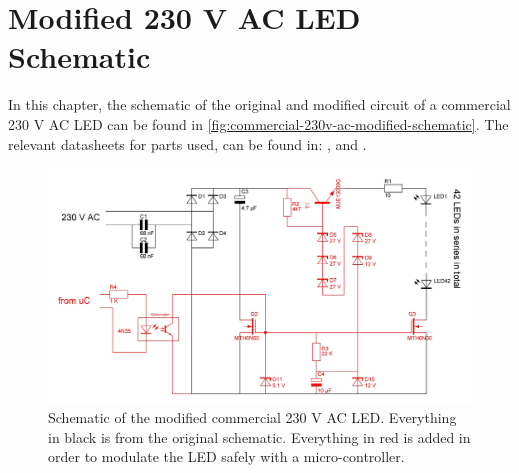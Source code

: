 
\chapter{Modified 230 V AC LED Schematic}
\label{app:commercial-230v-ac-modified-schematic}

In this chapter, the schematic of the original and modified circuit of a commercial 230 V AC LED can be found in \autoref{fig:commercial-230v-ac-modified-schematic}.
The relevant datasheets for parts used, can be found in: \cite{4n35-optocoupler-datasheet}, \cite{mth6n60-n-power-fet-datasheet} and \cite{mje13009g-npn-power-transistor-datasheet}.




\begin{figure}[htb]
	\includegraphics[angle=90,width=\textwidth,height=.9\textheight,keepaspectratio]{chapters/appendix/commercial-230v-ac-modified-schematic/commercial-230v-ac-modified-schematic.jpg}
	\caption{Schematic of the modified commercial 230 V AC LED. Everything in black is from the original schematic. Everything in red is added in order to modulate the LED safely with a micro-controller.}
	\label{fig:commercial-230v-ac-modified-schematic}
\end{figure}
